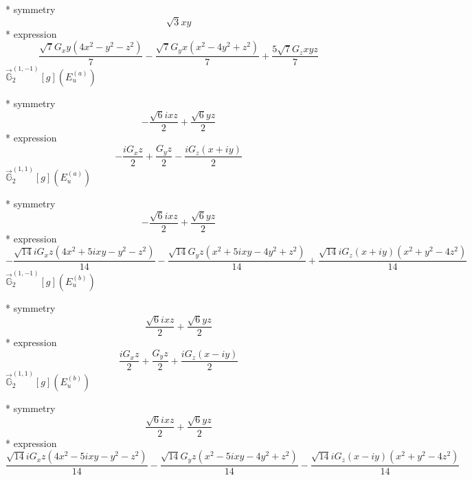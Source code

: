 \documentclass[fleqn,8pt]{jsarticle}
\begin{document}
\noindent\quad ** symmetry
\begin{dmath*}
\sqrt{3} x y
\end{dmath*}
\noindent\quad ** expression
\begin{dmath*}
\frac{\sqrt{7} G_{x} y \left(4 x^{2} - y^{2} - z^{2}\right)}{7} - \frac{\sqrt{7} G_{y} x \left(x^{2} - 4 y^{2} + z^{2}\right)}{7} + \frac{5 \sqrt{7} G_{z} x y z}{7}
\end{dmath*}
\noindent\quad $\vec{\mathbb{G}}_{2}^{(1,-1)}[g](E_{u}^{(a)})$

\noindent\quad ** symmetry
\begin{dmath*}
- \frac{\sqrt{6} i x z}{2} + \frac{\sqrt{6} y z}{2}
\end{dmath*}
\noindent\quad ** expression
\begin{dmath*}
- \frac{i G_{x} z}{2} + \frac{G_{y} z}{2} - \frac{i G_{z} \left(x + i y\right)}{2}
\end{dmath*}
\noindent\quad $\vec{\mathbb{G}}_{2}^{(1,1)}[g](E_{u}^{(a)})$

\noindent\quad ** symmetry
\begin{dmath*}
- \frac{\sqrt{6} i x z}{2} + \frac{\sqrt{6} y z}{2}
\end{dmath*}
\noindent\quad ** expression
\begin{dmath*}
- \frac{\sqrt{14} i G_{x} z \left(4 x^{2} + 5 i x y - y^{2} - z^{2}\right)}{14} - \frac{\sqrt{14} G_{y} z \left(x^{2} + 5 i x y - 4 y^{2} + z^{2}\right)}{14} + \frac{\sqrt{14} i G_{z} \left(x + i y\right) \left(x^{2} + y^{2} - 4 z^{2}\right)}{14}
\end{dmath*}
\noindent\quad $\vec{\mathbb{G}}_{2}^{(1,-1)}[g](E_{u}^{(b)})$

\noindent\quad ** symmetry
\begin{dmath*}
\frac{\sqrt{6} i x z}{2} + \frac{\sqrt{6} y z}{2}
\end{dmath*}
\noindent\quad ** expression
\begin{dmath*}
\frac{i G_{x} z}{2} + \frac{G_{y} z}{2} + \frac{i G_{z} \left(x - i y\right)}{2}
\end{dmath*}
\noindent\quad $\vec{\mathbb{G}}_{2}^{(1,1)}[g](E_{u}^{(b)})$

\noindent\quad ** symmetry
\begin{dmath*}
\frac{\sqrt{6} i x z}{2} + \frac{\sqrt{6} y z}{2}
\end{dmath*}
\noindent\quad ** expression
\begin{dmath*}
\frac{\sqrt{14} i G_{x} z \left(4 x^{2} - 5 i x y - y^{2} - z^{2}\right)}{14} - \frac{\sqrt{14} G_{y} z \left(x^{2} - 5 i x y - 4 y^{2} + z^{2}\right)}{14} - \frac{\sqrt{14} i G_{z} \left(x - i y\right) \left(x^{2} + y^{2} - 4 z^{2}\right)}{14}
\end{dmath*}
\end{document}
